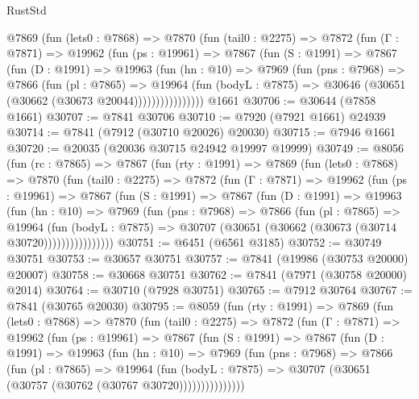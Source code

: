 \begin{lexlean}{RustStd}
\begin{coremodule}
{\begin{coremodule}
{{{{{{{{{{{{{{{{{{{{{{{{{{{{{{{{{{{{{{{{{{{{{{{{{{{{{{        @7869
          (fun (lets0 : @7868) =>
          @7870
            (fun (tail0 : @2275) =>
            @7872
              (fun (Γ : @7871) =>
              @19962
                (fun (ps : @19961) =>
                @7867
                  (fun (S : @1991) =>
                  @7867
                    (fun (D : @1991) =>
                    @19963
                      (fun (hn : @10) =>
                      @7969
                        (fun (pns : @7968) =>
                        @7866
                          (fun (pl : @7865) =>
                          @19964
                            (fun (bodyL : @7875) =>
                            @30646 (@30651 (@30662 (@30673 @20044))))))))))))))))
    @1661
@30706 := @30644 (@7858 @1661)
@30707 := @7841 @30706
@30710 := @7920 (@7921 @1661) @24939
@30714 := @7841 (@7912 (@30710 @20026) @20030)
@30715 := @7946 @1661
@30720 := @20035 (@20036 @30715 @24942 @19997 @19999)
@30749 := @8056
    (fun (rc : @7865) =>
    @7867
      (fun (rty : @1991) =>
      @7869
        (fun (lets0 : @7868) =>
        @7870
          (fun (tail0 : @2275) =>
          @7872
            (fun (Γ : @7871) =>
            @19962
              (fun (ps : @19961) =>
              @7867
                (fun (S : @1991) =>
                @7867
                  (fun (D : @1991) =>
                  @19963
                    (fun (hn : @10) =>
                    @7969
                      (fun (pns : @7968) =>
                      @7866
                        (fun (pl : @7865) =>
                        @19964
                          (fun (bodyL : @7875) =>
                          @30707 (@30651 (@30662 (@30673 (@30714 @30720))))))))))))))))
@30751 := @6451 (@6561 @3185)
@30752 := @30749 @30751
@30753 := @30657 @30751
@30757 := @7841 (@19986 (@30753 @20000) @20007)
@30758 := @30668 @30751
@30762 := @7841 (@7971 (@30758 @20000) @2014)
@30764 := @30710 (@7928 @30751)
@30765 := @7912 @30764
@30767 := @7841 (@30765 @20030)
@30795 := @8059
    (fun (rty : @1991) =>
    @7869
      (fun (lets0 : @7868) =>
      @7870
        (fun (tail0 : @2275) =>
        @7872
          (fun (Γ : @7871) =>
          @19962
            (fun (ps : @19961) =>
            @7867
              (fun (S : @1991) =>
              @7867
                (fun (D : @1991) =>
                @19963
                  (fun (hn : @10) =>
                  @7969
                    (fun (pns : @7968) =>
                    @7866
                      (fun (pl : @7865) =>
                      @19964
                        (fun (bodyL : @7875) =>
                        @30707 (@30651 (@30757 (@30762 (@30767 @30720)))))))))))))))
}}}}}}}}}}}}}}}}}}}}}}}}}}}}}}}}}}}}}}}}}}}}}}}}}}}}}}
\end{coremodule}}
\end{coremodule}
\end{lexlean}
